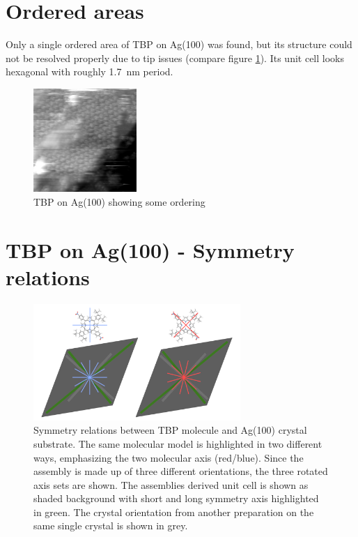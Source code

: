 \section{Ordered areas}
Only a single ordered area of TBP on Ag(100) was found, but its structure could not be resolved properly due to tip issues (compare figure \ref{fig:hex-TBP-Ag100}). Its unit cell looks hexagonal with roughly \SI{1.7} {\nano \meter} period. 

\begin{figure}[h!]
	\centering
	\includegraphics[width=0.35\textwidth]{./images/F151007-112800}
	\caption{TBP on Ag(100) showing some ordering}
	\label{fig:hex-TBP-Ag100}
\end{figure}
\section{TBP on Ag(100) - Symmetry relations}
	\begin{figure}[h!]
		\centering
		\includegraphics[width=0.7\textwidth]{./images/F160429-185245-R-model-2-crystal-orientation.png}
		\caption{Symmetry relations between TBP molecule and Ag(100) crystal substrate. The same molecular model is highlighted in two different ways, emphasizing the two molecular axis (red/blue). Since the assembly is made up of three different orientations, the three rotated axis sets are shown. The assemblies derived unit cell is shown as shaded background with short and long symmetry axis highlighted in green. The crystal orientation from another preparation on the same single crystal is shown in grey.}
		\label{F160429-185245-R-model-2-crystal-orientation.png}			
	\end{figure}
